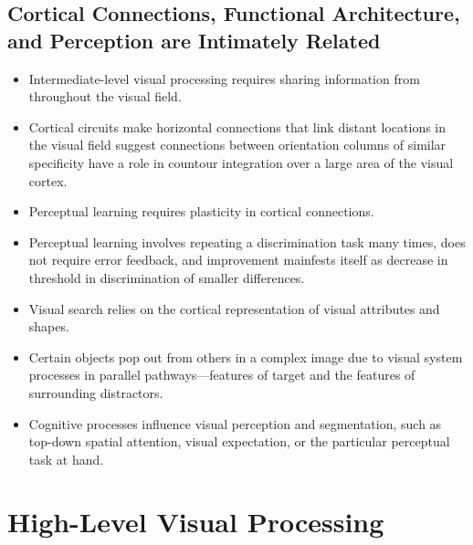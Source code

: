 \documentclass[12pt,a4paper]{article}
\begin{document}
\subsection{Cortical Connections, Functional Architecture, and Perception are Intimately Related}
\begin{itemize}
    \item Intermediate-level visual processing requires sharing information from throughout the visual field.
    \item Cortical circuits make horizontal connections that link distant locations in the visual field suggest connections between orientation columns of similar specificity have a role in countour integration over a large area of the visual cortex.
    \item Perceptual learning requires plasticity in cortical connections.
    \item Perceptual learning involves repeating a discrimination task many times, does not require error feedback, and improvement mainfests itself as decrease in threshold in discrimination of smaller differences.
    \item Visual search relies on the cortical representation of visual attributes and shapes.
    \item Certain objects pop out from others in a complex image due to visual system processes in parallel pathways---features of target and the features of surrounding distractors.
    \item Cognitive processes influence visual perception and segmentation, such as top-down spatial attention, visual expectation, or the particular perceptual task at hand.
\end{itemize}

\clearpage
\section{High-Level Visual Processing}
\end{document}
